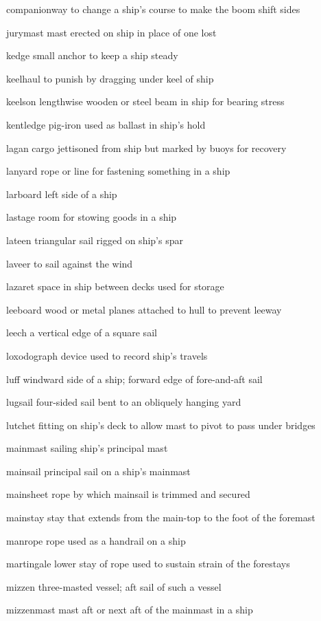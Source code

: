 \documentclass[
  11pt,
  msmallroyalvopaper
]{memoir}
\begin{document}
\begin{labeling}{companionway}
to change a ship's course to make the boom shift sides
\item[jurymast]
mast erected on ship in place of one lost
\item[kedge]
small anchor to keep a ship steady
\item[keelhaul]
to punish by dragging under keel of ship
\item[keelson]
lengthwise wooden or steel beam in ship for bearing stress
\item[kentledge]
pig-iron used as ballast in ship's hold
\item[lagan]
cargo jettisoned from ship but marked by buoys for recovery
\item[lanyard]
rope or line for fastening something in a ship
\item[larboard]
left side of a ship
\item[lastage]
room for stowing goods in a ship
\item[lateen]
triangular sail rigged on ship's spar
\item[laveer]
to sail against the wind
\item[lazaret]
space in ship between decks used for storage
\item[leeboard]
wood or metal planes attached to hull to prevent leeway
\item[leech]
a vertical edge of a square sail
\item[loxodograph]
device used to record ship's travels
\item[luff]
windward side of a ship; forward edge of fore-and-aft sail
\item[lugsail]
four-sided sail bent to an obliquely hanging yard
\item[lutchet]
fitting on ship's deck to allow mast to pivot to pass under bridges
\item[mainmast]
sailing ship's principal mast
\item[mainsail]
principal sail on a ship's mainmast
\item[mainsheet]
rope by which mainsail is trimmed and secured
\item[mainstay]
stay that extends from the main-top to the foot of the foremast
\item[manrope]
rope used as a handrail on a ship
\item[martingale]
lower stay of rope used to sustain strain of the forestays
\item[mizzen]
three-masted vessel; aft sail of such a vessel
\item[mizzenmast]
mast aft or next aft of the mainmast in a ship

\end{labeling}
\end{document}
